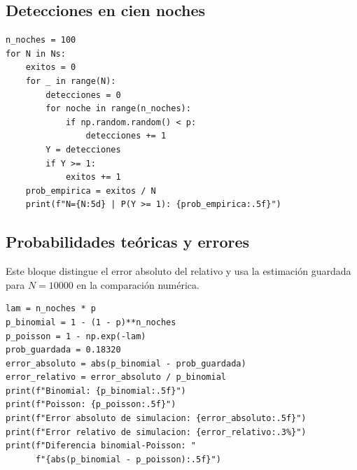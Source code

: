 \documentclass[11pt,a4paper]{article}
\begin{document}
\subsection{Detecciones en cien noches}

\begin{lstlisting}
n_noches = 100
for N in Ns:
    exitos = 0
    for _ in range(N):
        detecciones = 0
        for noche in range(n_noches):
            if np.random.random() < p:
                detecciones += 1
        Y = detecciones
        if Y >= 1:
            exitos += 1
    prob_empirica = exitos / N
    print(f"N={N:5d} | P(Y >= 1): {prob_empirica:.5f}")
\end{lstlisting}

\subsection{Probabilidades teóricas y errores}

Este bloque distingue el error absoluto del relativo y usa la estimación guardada para $N=10000$ en la comparación numérica.

\begin{lstlisting}
lam = n_noches * p
p_binomial = 1 - (1 - p)**n_noches
p_poisson = 1 - np.exp(-lam)
prob_guardada = 0.18320
error_absoluto = abs(p_binomial - prob_guardada)
error_relativo = error_absoluto / p_binomial
print(f"Binomial: {p_binomial:.5f}")
print(f"Poisson: {p_poisson:.5f}")
print(f"Error absoluto de simulacion: {error_absoluto:.5f}")
print(f"Error relativo de simulacion: {error_relativo:.3%}")
print(f"Diferencia binomial-Poisson: "
      f"{abs(p_binomial - p_poisson):.5f}")
\end{lstlisting}
\end{document}
